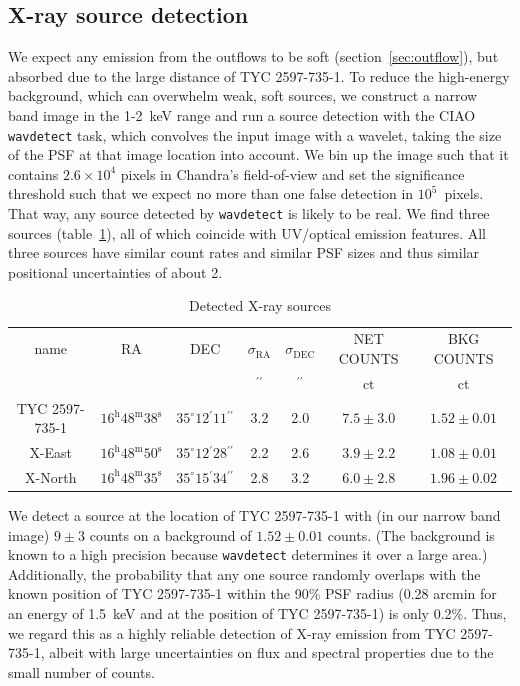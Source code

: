 \documentclass[]{aastex631}
\begin{document}
\subsection{X-ray source detection}
We expect any emission from the outflows to be soft (section~\ref{sec:outflow}), but absorbed due to the large distance of TYC 2597-735-1. To reduce the high-energy background, which can overwhelm weak, soft sources, we construct a narrow band image in the 1-2~keV range
and run a source detection with the CIAO \texttt{wavdetect} task, which convolves the input image with a wavelet, taking the size of the PSF at that image location into account. We bin up the image such that it contains $2.6\times10^4$ pixels in Chandra's field-of-view and set the significance threshold such that we expect no more than one false detection in $10^5$~pixels. That way, any source detected by \texttt{wavdetect} is likely to be real. We find three sources (table~\ref{tab:src}), all of which coincide with UV/optical emission features. All three sources have similar count rates and similar PSF sizes and thus similar positional uncertainties of about 2\arcsec{}.

\begin{table}
\caption{Detected X-ray sources\label{tab:src}}
\begin{tabular}{ccccccc}
\hline \hline
name & RA & DEC & $\sigma_\mathrm{RA}$ & $\sigma_\mathrm{DEC}$ & NET COUNTS & BKG COUNTS\\
 &  &  & $\mathrm{{}^{\prime\prime}}$ & $\mathrm{{}^{\prime\prime}}$ & $\mathrm{ct}$ & $\mathrm{ct}$ \\
\hline
TYC 2597-735-1 & $16^\mathrm{h}48^\mathrm{m}38^\mathrm{s}$ & $35^\circ12{}^\prime11{}^{\prime\prime}$ & 3.2 & 2.0 & $7.5 \pm 3.0$ & $1.52 \pm 0.01 $\\
X-East & $16^\mathrm{h}48^\mathrm{m}50^\mathrm{s}$ & $35^\circ12{}^\prime28{}^{\prime\prime}$ & 2.2 & 2.6 & $3.9 \pm 2.2$ & $1.08 \pm 0.01 $\\
X-North & $16^\mathrm{h}48^\mathrm{m}35^\mathrm{s}$ & $35^\circ15{}^\prime34{}^{\prime\prime}$ & 2.8 & 3.2 & $6.0 \pm 2.8$ & $1.96 \pm 0.02$ \\
\hline
\end{tabular}
\end{table}


We detect a source at the location of TYC 2597-735-1 with (in our narrow band image) $9\pm3$ counts on a background of $1.52\pm0.01$ counts. (The background is known to a high precision because \texttt{wavdetect} determines it over a large area.) Additionally, the probability that any one source randomly overlaps with the known position of TYC 2597-735-1 within the 90\% PSF radius (0.28 arcmin for an energy of 1.5~keV and at the position of TYC 2597-735-1) is only 0.2\%. Thus, we regard this as a highly reliable detection of X-ray emission from TYC 2597-735-1, albeit with large uncertainties on flux and spectral properties due to the small number of counts.
\end{document}
